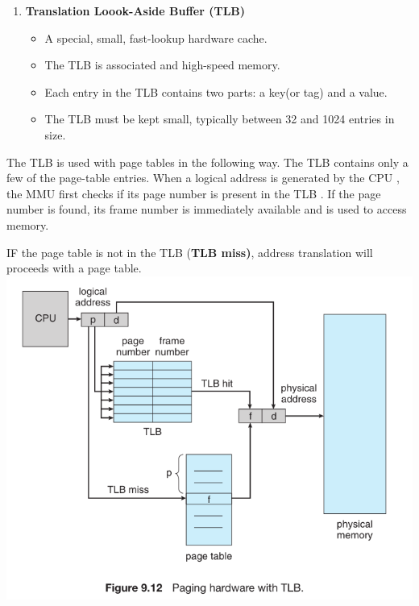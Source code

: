 \documentclass[10pt]{article}
\newcommand{\tf}{\textbf}
\begin{document}
\begin{enumerate}
	\item \tf{Translation Loook-Aside Buffer (TLB)} \\
	
	\begin{itemize}
		\item A special, small, fast-lookup hardware cache.
		\item The TLB is associated and high-speed memory.
		\item Each entry in the TLB contains two parts: a key(or tag) and a value.
		\item The TLB must be kept small, typically between 32 and 1024 entries in size.
	\end{itemize}
\end{enumerate}

\par{The TLB is used with page tables in the following way. The TLB contains only a few of the page-table entries. When a logical address is generated by the CPU , the MMU first checks if its page number is present in the TLB . If the page number is found, its frame number is immediately available and is used to access memory.} \\

\par{IF the page table is not in the TLB (\tf{TLB miss)}, address translation will proceeds with a page table.} \\

\bigbreak
\includegraphics[scale = 0.7]{TLB.png}
\bigbreak
\end{document}
